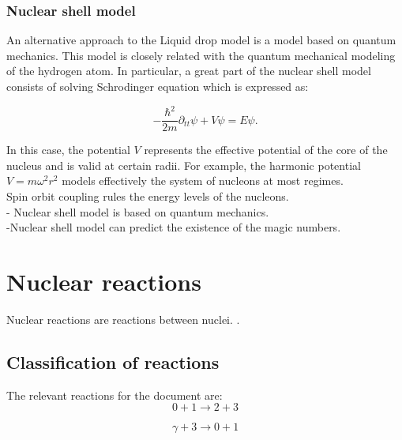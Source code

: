 \documentclass[openany]{book}
\begin{document}
\subsubsection{Nuclear shell model} 

An alternative approach to the Liquid drop model is a model based on quantum mechanics. This model is closely related with the quantum mechanical modeling of the hydrogen atom. In particular, a great part of the nuclear shell model consists of solving Schrodinger equation which is expressed as:

\begin{equation}
	- \frac{\hbar^2}{2m} \partial_{tt} \psi + V  \psi = E \psi.
\end{equation}

In this case, the potential $V$ represents the effective potential of the core of the nucleus and is valid at certain radii. For example, the harmonic potential $V = m\omega^2r^2$ models effectively the system of nucleons at most regimes. \\

Spin orbit coupling rules the energy levels of the nucleons.  \\

- Nuclear shell model is based on quantum mechanics. \\
-Nuclear shell model can predict the existence of the magic numbers.






\section{Nuclear reactions} \label{sec:nuclearReactions}

Nuclear reactions are reactions between nuclei.  \cite{bertulani_2003}. 



\subsection{Classification of reactions}

The relevant reactions for the document are:
\begin{equation}
	0 + 1 \rightarrow 2 + 3
\end{equation}

\begin{equation}
	\gamma + 3 \rightarrow 0 + 1
\end{equation}
\end{document}
